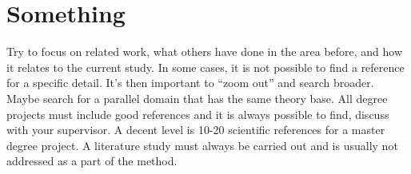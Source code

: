 \begin{comment}
To write notes or comments that isn't published in the pdf.
\end{comment}

\section{Something}
Try to focus on related work, what others have done in the area before, and how it relates to the current study. In some cases, it is not possible to find a reference for a specific detail. It’s then important to “zoom out” and search broader. Maybe search for a parallel domain that has the same theory base. All degree projects must include good references and it is always possible to find, discuss with your supervisor. A decent level is 10-20 scientific references for a master degree project. A literature study must always be carried out and is usually not addressed as a part of the method.